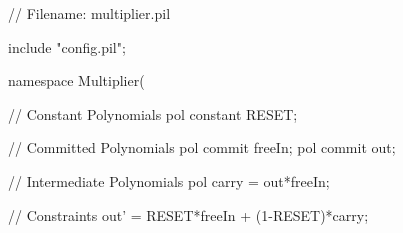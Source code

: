 \begin{pil}
// Filename: multiplier.pil

include "config.pil";

namespace Multiplier(%

    // Constant Polynomials
    pol constant RESET;

    // Committed Polynomials
    pol commit freeIn;
    pol commit out;

    // Intermediate Polynomials
    pol carry = out*freeIn;

    // Constraints
    out' = RESET*freeIn + (1-RESET)*carry;
\end{pil}








%
%
%
%
%
%
